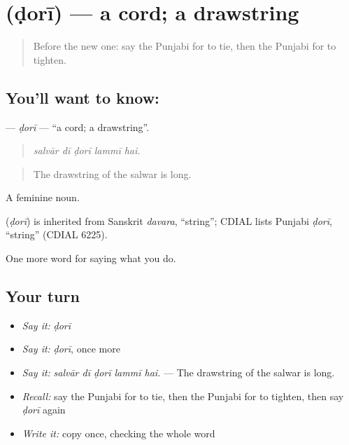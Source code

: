 \section[\texorpdfstring{\pa{ਡੋਰੀ} (ḍorī)}{ਡੋਰੀ (ḍorī)}]{ (ḍorī) — a cord; a drawstring}

\label{lesson:PA-C229-dori}



\begin{quote}
Before the new one: say the Punjabi for to tie, then the Punjabi for to tighten.
\end{quote}

\subsection*{You'll want to know: }
\textbf{} — \emph{ḍorī} — \textquotedblleft{}a cord; a drawstring\textquotedblright{}.

\begin{quote}
    
\end{quote}

\begin{quote}
\emph{salvār dī ḍorī lammī hai.}
\end{quote}

\begin{quote}
The drawstring of the salwar is long.
\end{quote}

A feminine noun.

\begin{cousinweb}
\textbf{} (\emph{ḍorī}) is inherited from Sanskrit \emph{davara}, \textquotedblleft{}string\textquotedblright{}; CDIAL lists Punjabi \emph{ḍorī}, \textquotedblleft{}string\textquotedblright{} (CDIAL 6225).
\end{cousinweb}

\begin{grammarlens}[title={What you've built}]
One more word for saying what you do.
\end{grammarlens}

\subsection*{Your turn}
\begin{itemize}
\raggedright
  \item \emph{Say it:} \emph{ḍorī}
  \item \emph{Say it:} \emph{ḍorī}, once more
  \item \emph{Say it:} \emph{salvār dī ḍorī lammī hai.} — The drawstring of the salwar is long.
  \item \emph{Recall:} say the Punjabi for to tie, then the Punjabi for to tighten, then say \emph{ḍorī} again
  \item \emph{Write it:} copy \textbf{} once, checking the whole word
\end{itemize}

